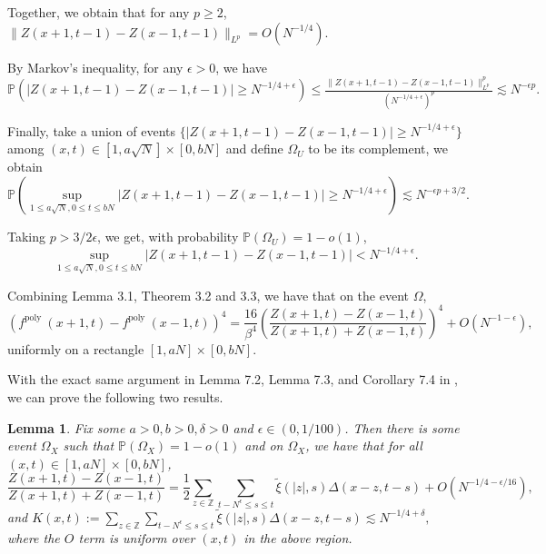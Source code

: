 \documentclass[10pt]{article}
\newtheorem{lemma}[theorem]{Lemma}
\begin{document}
Together, we obtain that for any $p \geq 2$, $\|Z(x+1, t-1)-Z(x-1, t-1)\|_{L^{p}}=O\left(N^{-1 / 4}\right).
$

By Markov's inequality, for any $\epsilon >0$, we have
$\mathbb{P}(|Z(x+1, t-1)-Z(x-1, t-1)| \geq N^{-1/4+\epsilon}) \leq   \frac{\|Z(x+1, t-1)-Z(x-1, t-1)\|^p_{L^{p}}}{(N^{-1/4+\epsilon})^p}
     \lesssim  N^{-\epsilon p}.$
     
Finally, take a union of events $\{ |Z(x+1, t-1)-Z(x-1, t-1)| \geq N^{-1/4+\epsilon}\}$ among $(x,t) \in [1, a\sqrt{N}] \times  [0, bN]$ and define $\Omega_U$ to be its complement, we obtain
\begin{equation}
    \mathbb{P}(\sup_{1 \leq a\sqrt{N}, 0 \leq t\leq bN}|Z(x+1, t-1)-Z(x-1, t-1)| \geq N^{-1/4+\epsilon})
     \lesssim  N^{-\epsilon p+3/2}.
\end{equation}

Taking $p>3/2\epsilon$, we get, with probability $\mathbb{P}(\Omega_U)=1-o(1)$, 
\begin{equation}
    \sup_{1 \leq a\sqrt{N}, 0 \leq t\leq bN}|Z(x+1, t-1)-Z(x-1, t-1)| < N^{-1/4+\epsilon}.
\end{equation}

Combining Lemma 3.1, Theorem 3.2 and 3.3, we have that on the event $\Omega$,
\begin{equation}
    \left(f^{\text {poly }}(x+1, t)-f^{\text {poly }}(x-1, t)\right)^{4}=\frac{16}{\beta^{4}}\left(\frac{Z(x+1, t)-Z(x-1, t)}{Z(x+1, t)+Z(x-1, t)}\right)^{4}+O\left(N^{-1-\epsilon}\right),
\end{equation}
uniformly on a rectangle $[1, a N] \times[0, b N]$.

With the exact same argument in Lemma 7.2, Lemma 7.3, and Corollary 7.4 in \cite{adhikari2022invariance}, we can prove the following two results.
\begin{lemma}
    Fix some $a>0, b>0, \delta>0$ and $\epsilon \in(0,1/100)$. Then there is some event $\Omega_{X}$ such that $\mathbb{P}\left(\Omega_{X}\right)=1-o(1)$ and on $\Omega_{X}$, we have that for all $(x, t) \in[1, a N] \times[0, b N]$,
    \begin{equation}
        \frac{Z(x+1, t)-Z(x-1, t)}{Z(x+1, t)+Z(x-1, t)}=\frac{1}{2} \sum_{z \in \mathbb{Z}} \sum_{t-N^{\epsilon} \leq s \leq t} \tilde{\xi}(|z|, s) \Delta(x-z, t-s)+O\left(N^{-1 / 4-\epsilon / 16}\right),
    \end{equation}
and $K(x,t):=\sum_{z \in \mathbb{Z}} \sum_{t-N^{\epsilon} \leq s \leq t} \tilde{\xi}(|z|, s) \Delta(x-z, t-s) \lesssim N^{-1/4+\delta},$
where the $O$ term is uniform over $(x, t)$ in the above region.
\end{lemma}
\end{document}
